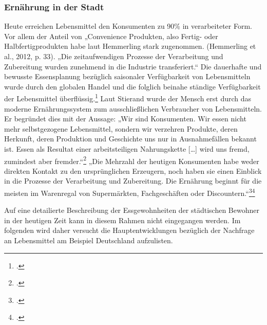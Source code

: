 \documentclass{scrartcl}
\begin{document}
\subsubsection {Ernährung in der Stadt}
Heute erreichen Lebensmittel den Konsumenten zu 90\% in verarbeiteter Form. Vor allem der Anteil von „Convenience Produkten, also Fertig- oder Halbfertigprodukten habe laut Hemmerling stark zugenommen. (Hemmerling et al., 2012, p. 33). „Die zeitaufwendigen Prozesse der Verarbeitung und Zubereitung wurden zunehmend in die Industrie transferiert.“  
Die dauerhafte und bewusste Essensplanung bezüglich saisonaler Verfügbarkeit von Lebensmitteln wurde durch den globalen Handel und die folglich beinahe ständige Verfügbarkeit der Lebensmittel überflüssig.\footcite[Vgl.][S.20]{SchmidtDieVon}
Laut Stierand wurde der Mensch erst durch das moderne Ernährungssystem zum ausschließlichen Verbraucher von Lebensmitteln. Er begründet dies mit der Aussage: „Wir sind Konsumenten. Wir essen nicht mehr selbstgezogene Lebensmittel, sondern wir verzehren Produkte, deren Herkunft, deren Produktion und Geschichte uns nur in Ausnahmefällen bekannt ist. Essen als Resultat einer arbeitsteiligen Nahrungskette […] wird uns fremd, zumindest aber fremder.“\footcite{Spiekermann2000GesundeKulturwissenschaft} 
„Die Mehrzahl der heutigen Konsumenten habe weder direkten Kontakt zu den ursprünglichen Erzeugern, noch haben sie einen Einblick in die Prozesse der Verarbeitung und Zubereitung.
Die Ernährung beginnt für die meisten im Warenregal von Supermärkten, Fachgeschäften oder Discountern.“\footcite[S.20]{SchmidtDieVon}\footcite[Vgl.]{BerichtInhalt}

 Auf eine detailierte Beschreibung der Essgewohnheiten der städtischen Bewohner in der heutigen Zeit kann in diesem Rahmen nicht eingegangen werden. Im folgenden wird daher versucht die Hauptentwicklungen bezüglich der Nachfrage an Lebensmittel am Beispiel Deutschland aufzulisten. 
 
\end{document}
